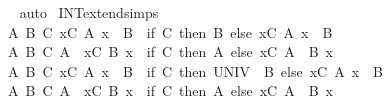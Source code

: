 \begin{isabellebody}
%
\isadelimproof
\ \ %
\endisadelimproof
%
\isatagproof
{}\isamarkupfalse%
\ auto%
\endisatagproof
{\isafoldproof}%
%
\isadelimproof
\isanewline
%
\endisadelimproof
\isanewline
{}\isamarkupfalse%
\ INT{\isacharunderscore}{\kern0pt}extend{\isacharunderscore}{\kern0pt}simps{\isacharcolon}{\kern0pt}\isanewline
\ \ {\isachardoublequoteopen}{\isasymAnd}A\ B\ C{\isachardot}{\kern0pt}\ {\isacharparenleft}{\kern0pt}{\isasymInter}x{\isasymin}C{\isachardot}{\kern0pt}\ A\ x{\isacharparenright}{\kern0pt}\ {\isasyminter}\ B\ {\isacharequal}{\kern0pt}\ {\isacharparenleft}{\kern0pt}if\ C{\isacharequal}{\kern0pt}{\isacharbraceleft}{\kern0pt}{\isacharbraceright}{\kern0pt}\ then\ B\ else\ {\isacharparenleft}{\kern0pt}{\isasymInter}x{\isasymin}C{\isachardot}{\kern0pt}\ A\ x\ {\isasyminter}\ B{\isacharparenright}{\kern0pt}{\isacharparenright}{\kern0pt}{\isachardoublequoteclose}\isanewline
\ \ {\isachardoublequoteopen}{\isasymAnd}A\ B\ C{\isachardot}{\kern0pt}\ A\ {\isasyminter}\ {\isacharparenleft}{\kern0pt}{\isasymInter}x{\isasymin}C{\isachardot}{\kern0pt}\ B\ x{\isacharparenright}{\kern0pt}\ {\isacharequal}{\kern0pt}\ {\isacharparenleft}{\kern0pt}if\ C{\isacharequal}{\kern0pt}{\isacharbraceleft}{\kern0pt}{\isacharbraceright}{\kern0pt}\ then\ A\ else\ {\isacharparenleft}{\kern0pt}{\isasymInter}x{\isasymin}C{\isachardot}{\kern0pt}\ A\ {\isasyminter}\ B\ x{\isacharparenright}{\kern0pt}{\isacharparenright}{\kern0pt}{\isachardoublequoteclose}\isanewline
\ \ {\isachardoublequoteopen}{\isasymAnd}A\ B\ C{\isachardot}{\kern0pt}\ {\isacharparenleft}{\kern0pt}{\isasymInter}x{\isasymin}C{\isachardot}{\kern0pt}\ A\ x{\isacharparenright}{\kern0pt}\ {\isacharminus}{\kern0pt}\ B\ {\isacharequal}{\kern0pt}\ {\isacharparenleft}{\kern0pt}if\ C{\isacharequal}{\kern0pt}{\isacharbraceleft}{\kern0pt}{\isacharbraceright}{\kern0pt}\ then\ UNIV\ {\isacharminus}{\kern0pt}\ B\ else\ {\isacharparenleft}{\kern0pt}{\isasymInter}x{\isasymin}C{\isachardot}{\kern0pt}\ A\ x\ {\isacharminus}{\kern0pt}\ B{\isacharparenright}{\kern0pt}{\isacharparenright}{\kern0pt}{\isachardoublequoteclose}\isanewline
\ \ {\isachardoublequoteopen}{\isasymAnd}A\ B\ C{\isachardot}{\kern0pt}\ A\ {\isacharminus}{\kern0pt}\ {\isacharparenleft}{\kern0pt}{\isasymUnion}x{\isasymin}C{\isachardot}{\kern0pt}\ B\ x{\isacharparenright}{\kern0pt}\ {\isacharequal}{\kern0pt}\ {\isacharparenleft}{\kern0pt}if\ C{\isacharequal}{\kern0pt}{\isacharbraceleft}{\kern0pt}{\isacharbraceright}{\kern0pt}\ then\ A\ else\ {\isacharparenleft}{\kern0pt}{\isasymInter}x{\isasymin}C{\isachardot}{\kern0pt}\ A\ {\isacharminus}{\kern0pt}\ B\ x{\isacharparenright}{\kern0pt}{\isacharparenright}{\kern0pt}{\isachardoublequoteclose}\isanewline

\end{isabellebody}

